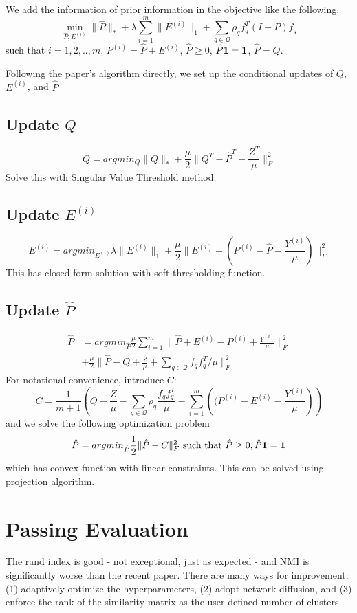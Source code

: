 \documentclass[11pt]{article}
\begin{document}
\noindent We add the information of prior information in the objective like the following. 
$$\min_{\hat{P}, E^{(i)}} \|\hat{P}\|_* + \lambda \sum_{i=1}^{m} \|E^{(i)}\|_1 + \sum_{q \in \mathcal{Q}} \rho_q f_q ^T (I-P) f_q$$
such that $i = 1, 2, .., m$, $P^{(i)} = \hat{P} + E^{(i)}$, $\hat{P}\geq 0$, $\hat{P} \bf{1} = \bf{1}$, $\hat{P} = Q$. 

\noindent Following the paper's algorithm directly, we set up the conditional updates of $Q$, $E^{(i)}$, and $\hat{P}$



\subsection*{Update $Q$}
$$Q = argmin_Q \|Q \| _* + \frac{\mu}{2} \|Q^T - \hat{P}^T - \frac{Z^T}{\mu}\|_F^2$$
Solve this with Singular Value Threshold method.

\subsection*{Update $E^{(i)}$}
$$E^{(i)} = argmin_{E^{(i)}} \lambda \|E^{(i)}\|_1 + \frac{\mu}{2}
\| E^{(i)} - (P^{(i)} - \hat{P} - \frac{Y^{(i)}}{\mu}) \|_F^2$$
This has closed form solution with soft thresholding function.

\subsection*{Update $\hat{P}$}
\begin{align*}
\hat{P} &= argmin_{\hat{P}} \frac{\mu}{2} \sum_{i=1}^{m} 
\| \hat{P} + E^{(i)} - P^{(i)} + \frac{Y^{(i)}}{\mu}\|_F^2\\
&+\frac{\mu}{2} \|\hat{P} - Q + \frac{Z}{\mu} + \sum_{q \in \mathcal{Q}} f_q f_q^T / \mu\|_F^2
\end{align*}
For notational convenience, introduce $C$:
$$C = \frac{1}{m+1} \left(Q-\frac{Z}{\mu} - \sum_{q\in \mathcal{Q}} \rho_q \frac{f_q f_q^T}{\mu} -\sum_{i=1}^{m}  \left(  (P^{(i)}-E^{(i)}-\frac{Y^{(i)}}{\mu}\right) \right)$$
and we solve the following optimization problem
$$\hat{P} = argmin_{\hat{P}} \frac{1}{2} \|\hat{P}-C\|_F^2 \text{ such that } \hat{P} \geq 0, \hat{P}\bf{1} = \bf{1}$$
which has convex function with linear constraints. This can be solved using projection algorithm. 


\section*{Passing Evaluation}
The rand index is good - not exceptional, just as expected - and NMI is significantly worse than the recent paper. There are many ways for improvement: (1) adaptively optimize the hyperparameters, (2) adopt network diffusion, and (3) enforce the rank of the similarity matrix as the user-defined number of clusters.\\
\end{document}
